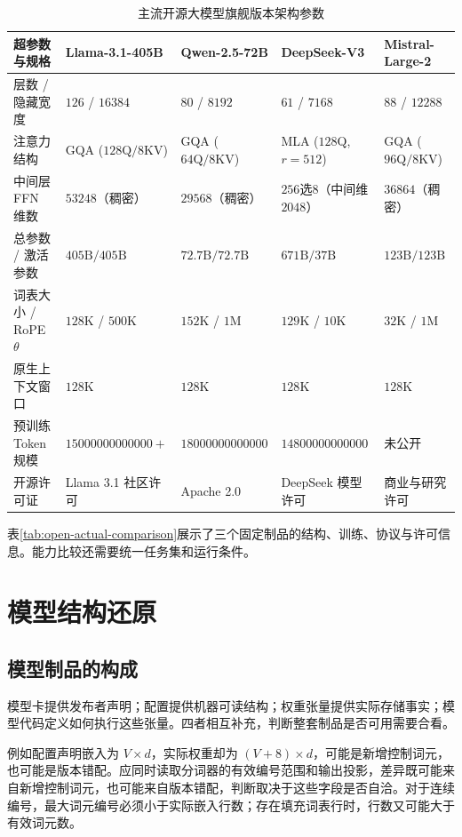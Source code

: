 \documentclass[../textbook.tex]{subfiles}
\begin{document}
\begin{table}[htbp]
\centering
\caption{主流开源大模型旗舰版本架构参数}\label{tab:open-flagships}
\begin{tabularx}{\linewidth}{lXXXX}
\toprule
超参数与规格 & Llama-3.1-405B & Qwen-2.5-72B & DeepSeek-V3 & Mistral-Large-2\\\midrule
层数 / 隐藏宽度 & $126$ / $16384$ & $80$ / $8192$ & $61$ / $7168$ & $88$ / $12288$\\
注意力结构 & GQA ($128\text{Q}/8\text{KV}$) & GQA ($64\text{Q}/8\text{KV}$) & MLA ($128\text{Q}$, $r=512$) & GQA ($96\text{Q}/8\text{KV}$)\\
中间层 FFN 维数 & $53248$（稠密） & $29568$（稠密） & $256$选$8$（中间维$2048$） & $36864$（稠密）\\
总参数 / 激活参数 & $405\text{B} / 405\text{B}$ & $72.7\text{B} / 72.7\text{B}$ & $671\text{B} / 37\text{B}$ & $123\text{B} / 123\text{B}$\\
词表大小 / RoPE $\theta$ & $128\text{K}$ / $500\text{K}$ & $152\text{K}$ / $1\text{M}$ & $129\text{K}$ / $10\text{K}$ & $32\text{K}$ / $1\text{M}$\\
原生上下文窗口 & $128\text{K}$ & $128\text{K}$ & $128\text{K}$ & $128\text{K}$\\
预训练 Token 规模 & $\num{15000000000000}+$ & $\num{18000000000000}$ & $\num{14800000000000}$ & 未公开\\
开源许可证 & Llama 3.1 社区许可 & Apache 2.0 & DeepSeek 模型许可 & 商业与研究许可\\
\bottomrule
\end{tabularx}
\end{table}

表\ref{tab:open-actual-comparison}展示了三个固定制品的结构、训练、协议与许可信息。能力比较还需要统一任务集和运行条件。

\section{模型结构还原}

\subsection{模型制品的构成}
模型卡提供发布者声明；配置提供机器可读结构；权重张量提供实际存储事实；模型代码定义如何执行这些张量。四者相互补充，判断整套制品是否可用需要合看。

例如配置声明嵌入为 $V\times d$，实际权重却为 $(V+8)\times d$，可能是新增控制词元，也可能是版本错配。应同时读取分词器的有效编号范围和输出投影，差异既可能来自新增控制词元，也可能来自版本错配，判断取决于这些字段是否自洽。对于连续编号，最大词元编号必须小于实际嵌入行数；存在填充词表行时，行数又可能大于有效词元数。
\end{document}
